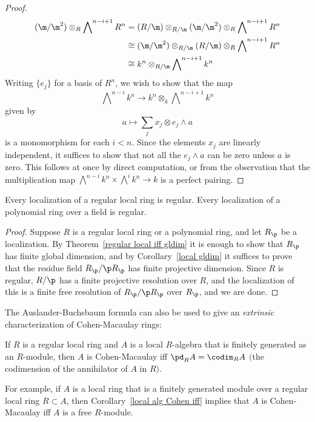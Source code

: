 \begin{proof}
\begin{align*}
(\m/\m^2)\otimes_R\bigwedge\nolimits^{n-i+1}R^n&=(R/\m)\otimes_{R/\m}(\m/\m^2)\otimes_R\bigwedge\nolimits^{n-i+1}R^n\\
&\cong (\m/\m^2)\otimes_{R/\m}(R/\m)\otimes_R\bigwedge\nolimits^{n-i+1}R^n\\
&\cong k^n\otimes_{R/\m}\bigwedge\nolimits^{n-i+1}k^n
\end{align*}
Writing $\{e_j\}$ for a basis of $R^n$, we wish to show that the map
\[\bigwedge\nolimits^{n-i}k^n\to k^n\otimes_k\bigwedge\nolimits^{n-i+1}k^n\]
given by
\[a\mapsto \sum_jx_j\otimes e_j\wedge a\]
is a monomorphism for each $i<n$. Since the elements $x_j$ are linearly independent, it suffices to show that not all the $e_j\wedge a$ can be zero unless $a$ is zero. This follows at once by direct computation, or from the observation that the multiplication map $\bigwedge^{n-i}k^n\times\bigwedge^ik^n\to k$ is a perfect pairing.
\end{proof}
\begin{corollary}
Every localization of a regular local ring is regular. Every localization of a polynomial ring over a field is regular.
\end{corollary}
\begin{proof}
Suppose $R$ is a regular local ring or a polynomial ring, and let $R_\p$
be a localization. By Theorem~\ref{regular local iff gldim} it is enough to show that $R_\p$ has finite global dimension, and by Corollary~\ref{local gldim} it suffices to prove that the residue field $R_\p/\p R_\p$ has finite projective dimension. Since $R$ is regular, $R/\p$ has a finite projective resolution over $R$, and the localization of this is a finite free resolution of $R_\p/\p R_\p$ over $R_\p$, and we are done.
\end{proof}
The Auslander-Buchsbaum formula can also be used to give an \textit{extrinsic} characterization of Cohen-Macaulay rings:
\begin{corollary}\label{local alg Cohen iff}
If $R$ is a regular local ring and $A$ is a local $R$-algebra that is finitely generated as an $R$-module, then $A$ is Cohen-Macaulay iff $\pd_RA=\codim_RA$ $($the codimension of the annihilator of $A$ in $R$$)$.
\end{corollary}
For example, if $A$ is a local ring that is a finitely generated module over a regular local ring $R\subset A$, then Corollary~\ref{local alg Cohen iff} implies that $A$ is Cohen-Macaulay iff $A$ is a free $R$-module.
